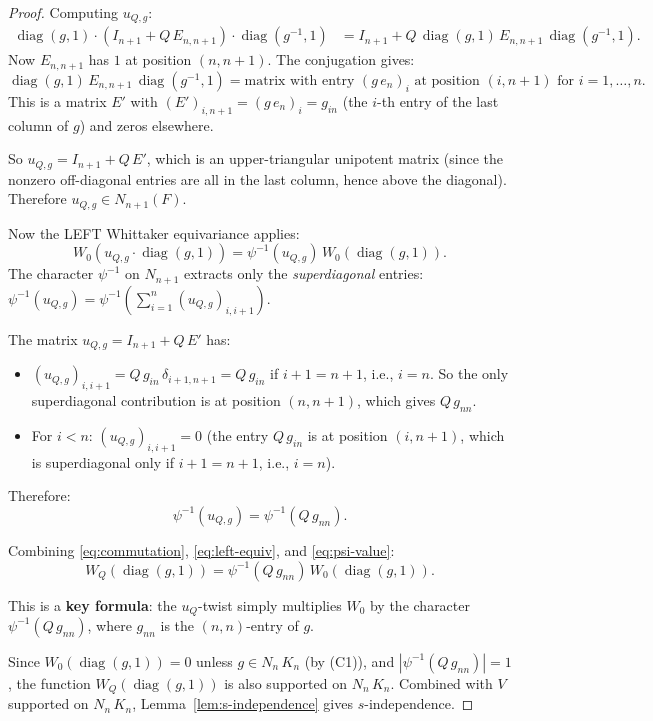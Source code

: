 \begin{proof}
Computing $u_{Q,g}$:
\begin{align*}
  \operatorname{diag}(g,1) \cdot (I_{n+1} + Q\,E_{n,n+1}) \cdot \operatorname{diag}(g^{-1},1)
  &= I_{n+1} + Q\,\operatorname{diag}(g,1)\,E_{n,n+1}\,\operatorname{diag}(g^{-1},1).
\end{align*}
Now $E_{n,n+1}$ has $1$ at position $(n,n+1)$. The conjugation gives:
\[
  \operatorname{diag}(g,1)\,E_{n,n+1}\,\operatorname{diag}(g^{-1},1)
  = \text{matrix with entry } (g\,e_n)_i \text{ at position } (i, n+1)
    \text{ for } i = 1,\ldots,n.
\]
This is a matrix $E'$ with $(E')_{i,n+1} = (g\,e_n)_i = g_{in}$ (the $i$-th
entry of the last column of $g$) and zeros elsewhere.

So $u_{Q,g} = I_{n+1} + Q\,E'$, which is an upper-triangular unipotent matrix
(since the nonzero off-diagonal entries are all in the last column, hence
above the diagonal). Therefore $u_{Q,g} \in N_{n+1}(F)$.

Now the LEFT Whittaker equivariance applies:
\begin{equation}\label{eq:left-equiv}
  W_0(u_{Q,g} \cdot \operatorname{diag}(g,1))
  = \psi^{-1}(u_{Q,g})\,W_0(\operatorname{diag}(g,1)).
\end{equation}
The character $\psi^{-1}$ on $N_{n+1}$ extracts only the \emph{superdiagonal}
entries: $\psi^{-1}(u_{Q,g}) = \psi^{-1}\!\left(\sum_{i=1}^{n} (u_{Q,g})_{i,i+1}\right)$.

The matrix $u_{Q,g} = I_{n+1} + Q\,E'$ has:
\begin{itemize}
\item $(u_{Q,g})_{i,i+1} = Q\,g_{in}\,\delta_{i+1,n+1} = Q\,g_{in}$ if $i+1 = n+1$,
  i.e., $i = n$. So the only superdiagonal contribution is at position $(n,n+1)$,
  which gives $Q\,g_{nn}$.
\item For $i < n$: $(u_{Q,g})_{i,i+1} = 0$ (the entry $Q\,g_{in}$ is at
  position $(i, n+1)$, which is superdiagonal only if $i + 1 = n + 1$, i.e., $i = n$).
\end{itemize}

Therefore:
\begin{equation}\label{eq:psi-value}
  \psi^{-1}(u_{Q,g}) = \psi^{-1}(Q\,g_{nn}).
\end{equation}

Combining \eqref{eq:commutation}, \eqref{eq:left-equiv}, and \eqref{eq:psi-value}:
\begin{equation}\label{eq:WQ-final}
  W_Q(\operatorname{diag}(g,1))
  = \psi^{-1}(Q\,g_{nn})\,W_0(\operatorname{diag}(g,1)).
\end{equation}

This is a \textbf{key formula}: the $u_Q$-twist simply multiplies $W_0$ by
the character $\psi^{-1}(Q\,g_{nn})$, where $g_{nn}$ is the $(n,n)$-entry
of $g$.

Since $W_0(\operatorname{diag}(g,1)) = 0$ unless $g \in N_n\,K_n$ (by (C1)),
and $|\psi^{-1}(Q\,g_{nn})| = 1$, the function $W_Q(\operatorname{diag}(g,1))$
is also supported on $N_n\,K_n$. Combined with $V$ supported on $N_n\,K_n$,
Lemma~\ref{lem:s-independence} gives $s$-independence.
\end{proof}

